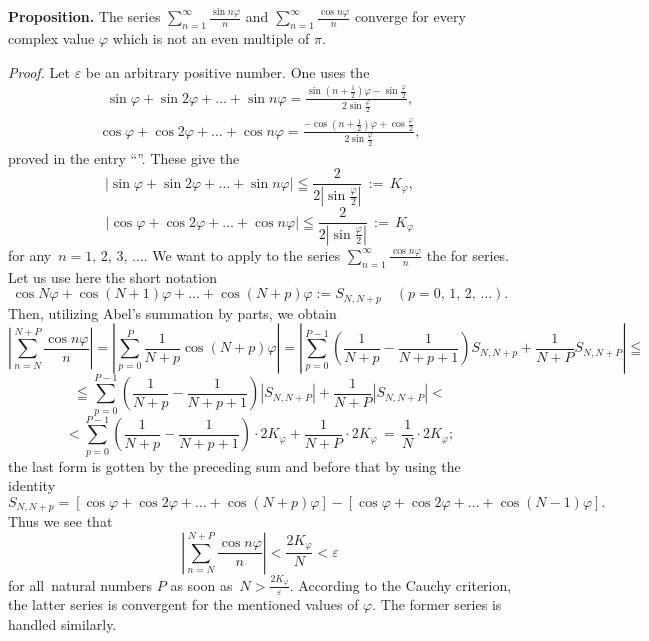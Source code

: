 \documentclass[12pt]{article}
\theoremstyle{definition}
\begin{document}
\textbf{Proposition.}  The series $\displaystyle\sum_{n=1}^\infty\frac{\sin{n\varphi}}{n}$ and $\displaystyle\sum_{n=1}^\infty\frac{\cos{n\varphi}}{n}$ converge for every complex value $\varphi$ which is not an even multiple of $\pi$.

{\em Proof.}  Let $\varepsilon$ be an arbitrary positive number.  One uses the 
\begin{align}
\sin{\varphi}+\sin{2\varphi}+\ldots+\sin{n\varphi} = 
\frac{\sin(n+\frac{1}{2})\varphi-\sin\frac{\varphi}{2}}{2\sin\frac{\varphi}{2}},
\end{align}
\begin{align}
\cos{\varphi}+\cos{2\varphi}+\ldots+\cos{n\varphi} = 
\frac{-\cos(n+\frac{1}{2})\varphi+\cos\frac{\varphi}{2}}{2\sin\frac{\varphi}{2}},
\end{align}
proved in the entry ``''.  These give the 
$$|\sin{\varphi}+\sin{2\varphi}+\ldots+\sin{n\varphi}| \leqq \frac{2}{2|\sin\frac{\varphi}{2}|}\, :=\, K_\varphi,$$
$$|\cos{\varphi}+\cos{2\varphi}+\ldots+\cos{n\varphi}| \leqq \frac{2}{2|\sin\frac{\varphi}{2}|}\, :=\, K_\varphi$$
for any\, $n = 1,\,2,\,3,\,\ldots$.  
We want to apply to the series $\sum_{n=1}^\infty\frac{\cos{n\varphi}}{n}$ the  for series.  Let us use here the short notation
$$\cos{N\varphi}+\cos{(N\!+\!1)\varphi}+\ldots+\cos{(N\!+\!p)\varphi} := S_{N,N+p}\quad 
(p = 0,\,1,\,2,\,\ldots).$$
Then, utilizing Abel's summation by parts, we obtain
$$\left|\sum_{n=N}^{N+P}\frac{\cos{n\varphi}}{n}\right| = 
\left|\sum_{p=0}^{P}\frac{1}{N\!+\!p}\cos{(N+p)\varphi}\right| = 
\left|\sum_{p=0}^{P-1}\left(\frac{1}{N\!+\!p}-\frac{1}{N\!+\!p\!+\!1}\right)S_{N,N+p}+\frac{1}{N\!+\!P}S_{N,N+P}\right| \leqq$$
$$\leqq \sum_{p=0}^{P-1}\left(\frac{1}{N\!+\!p}-\frac{1}{N\!+\!p\!+\!1}\right)|S_{N,N+P}|
+\frac{1}{N+P}|S_{N,N+P}| <$$ 
$$< \sum_{p=0}^{P-1}\left(\frac{1}{N\!+\!p}-\frac{1}{N\!+\!p\!+\!1}\right)\cdot2K_\varphi+\frac{1}{N\!+\!P}\cdot2K_\varphi\, =\, \frac{1}{N}\cdot2K_\varphi;$$
the last form is gotten by  the preceding sum and before that by using the identity
$$S_{N,N+p} = [\cos\varphi+\cos2\varphi+\ldots+\cos(N\!+\!p)\varphi]-[\cos\varphi+\cos2\varphi+\ldots
+\cos(N\!-\!1)\varphi].$$
Thus we see that
$$\left|\sum_{n=N}^{N+P}\frac{\cos{n\varphi}}{n}\right| < \frac{2K_\varphi}{N} < \varepsilon$$
for all\, natural numbers $P$ as soon as\, $N > \frac{2K_\varphi}{\varepsilon}$.  According to the Cauchy criterion, the latter series is convergent for the mentioned values of $\varphi$.  The former series is handled similarly.



\end{document}
